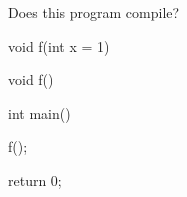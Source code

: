 Does this program compile?



\begin{consolethree}[escapeinside=||]

void f(int x = 1) {}

void f() {}



int main()

{

    f();

    return 0;

}

\end{consolethree}

